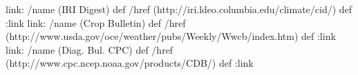 
\begin{ingrid}

link:
/name (IRI Digest) def
/href (http://iri.ldeo.columbia.edu/climate/cid/) def
:link
link:
/name (Crop Bulletin) def
/href (http://www.usda.gov/oce/weather/pubs/Weekly/Wwcb/index.htm) def
:link
link:
/name (Diag. Bul. CPC) def
/href (http://www.cpc.ncep.noaa.gov/products/CDB/) def
:link

\end{ingrid}
